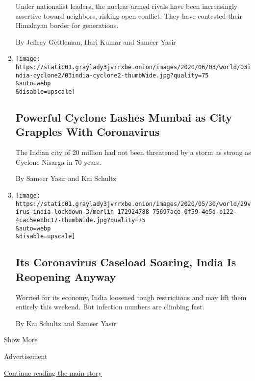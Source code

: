 \begin{enumerate}
  Under nationalist leaders, the nuclear-armed rivals have been
  increasingly assertive toward neighbors, risking open conflict. They
  have contested their Himalayan border for generations.

  By Jeffrey Gettleman, Hari Kumar and Sameer Yasir
\item
  \href{/2020/06/03/world/asia/cyclone-nisarga-india-mumbai.html}{}

  \texttt{[image: https://static01.graylady3jvrrxbe.onion/images/2020/06/03/world/03india-cyclone2/03india-cyclone2-thumbWide.jpg?quality=75\\\&auto=webp\\\&disable=upscale]}

  \hypertarget{powerful-cyclone-lashes-mumbai-as-city-grapples-with-coronavirus}{%
  \subsection{Powerful Cyclone Lashes Mumbai as City Grapples With
  Coronavirus}\label{powerful-cyclone-lashes-mumbai-as-city-grapples-with-coronavirus}}

  The Indian city of 20 million had not been threatened by a storm as
  strong as Cyclone Nisarga in 70 years.

  By Sameer Yasir and Kai Schultz
\item
  \href{/2020/05/29/world/asia/coronavirus-india-lockdown.html}{}

  \texttt{[image: https://static01.graylady3jvrrxbe.onion/images/2020/05/30/world/29virus-india-lockdown-3/merlin\_172924788\_75697ace-0f59-4e5d-b122-4cac5ee8bc17-thumbWide.jpg?quality=75\\\&auto=webp\\\&disable=upscale]}

  \hypertarget{its-coronavirus-caseload-soaring-india-is-reopening-anyway}{%
  \subsection{Its Coronavirus Caseload Soaring, India Is Reopening
  Anyway}\label{its-coronavirus-caseload-soaring-india-is-reopening-anyway}}

  Worried for its economy, India loosened tough restrictions and may
  lift them entirely this weekend. But infection numbers are climbing
  fast.

  By Kai Schultz and Sameer Yasir
\end{enumerate}

Show More

Advertisement

\protect\hyperlink{after-mid2}{Continue reading the main story}

